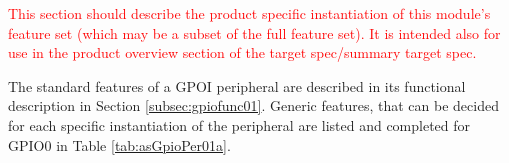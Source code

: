 \textcolor{red}{This section should describe the product specific instantiation of this module’s feature set (which may be a subset of the full feature set). It is intended also for use in the product overview section of the target spec/summary target spec.}

The standard features of a GPOI peripheral are described in its functional description in Section \ref{subsec:gpiofunc01}. Generic features, that can be decided for each specific instantiation of the peripheral are listed and completed for GPIO0 in Table \ref{tab:asGpioPer01a}.
